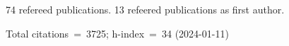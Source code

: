 74 refereed publications. 13 refeered publications as first author.

Total citations~=~3725; h-index~=~34 (2024-01-11)